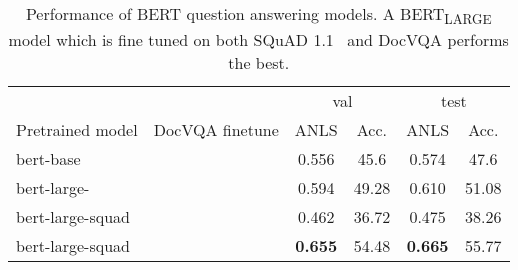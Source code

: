 \documentclass[10pt,twocolumn,letterpaper]{article}
\newcommand{\datasetName}{DocVQA\xspace}
\newcommand{\squad}{SQuAD 1.1\xspace}
\newcommand{\cmark}{\ding{51}}\newcommand{\xmark}{\ding{55}}
\begin{document}
\begin{table}[b]
\small
\begin{tabularx}{\linewidth}{X |X| c c c c}
\toprule
&   &\multicolumn{2}{c}{val} & \multicolumn{2}{c}{test} \\             
Pretrained model   & \datasetName finetune  & ANLS & Acc.  & ANLS & Acc.  \\
\midrule

bert-base & \cmark  & 0.556 & 45.6 & 0.574 & 47.6 \\ bert-large- & \cmark  & 0.594 & 49.28 & 0.610 & 51.08 \\ bert-large-squad  & \xmark  & 0.462 & 36.72 & 0.475 & 38.26 \\ bert-large-squad   & \cmark  & \textbf{0.655} & 54.48 & \textbf{0.665} & 55.77 \\ 


\bottomrule
\end{tabularx}
\caption{Performance of BERT question answering models. A BERT\textsubscript{LARGE}  model which is fine tuned on both \squad~\cite{squad} and \datasetName performs the best.}
\label{tab:bert_results}
\vspace{-2mm}

\end{table}
\end{document}
